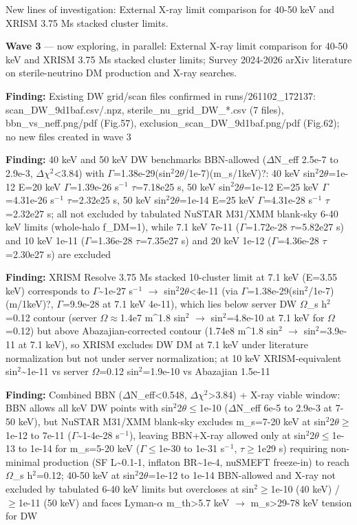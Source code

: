\documentclass[11pt,a4paper]{article}
\begin{document}
New lines of investigation: External X-ray limit comparison for 40-50 keV and XRISM 3.75 Ms stacked cluster limits.

\textbf{Wave 3} --- now exploring, in parallel: External X-ray limit comparison for 40-50 keV and XRISM 3.75 Ms stacked cluster limits; Survey 2024-2026 arXiv literature on sterile-neutrino DM production and X-ray searches.

\textbf{Finding:} Existing DW grid/scan files confirmed in runs/261102\_172137: scan\_DW\_9d1baf.csv/.npz, sterile\_nu\_grid\_DW\_*.csv (7 files), bbn\_vs\_neff.png/pdf (Fig.57), exclusion\_scan\_DW\_9d1baf.png/pdf (Fig.62); no new files created in wave 3

\textbf{Finding:} 40 keV and 50 keV DW benchmarks BBN-allowed ($\Delta$N\_eff 2.5e-7 to 2.9e-3, $\Delta$$\chi$$^2$\textless{}3.84) with $\Gamma$=1.38e-29(sin$^2$2$\theta$/1e-7)(m\_s/1keV)?: 40 keV sin$^2$2$\theta$=1e-12 E=20 keV $\Gamma$=1.39e-26 s$^-$$^1$ $\tau$=7.18e25 s, 50 keV sin$^2$2$\theta$=1e-12 E=25 keV $\Gamma$=4.31e-26 s$^-$$^1$ $\tau$=2.32e25 s, 50 keV sin$^2$2$\theta$=1e-14 E=25 keV $\Gamma$=4.31e-28 s$^-$$^1$ $\tau$=2.32e27 s; all not excluded by tabulated NuSTAR M31/XMM blank-sky 6-40 keV limits (whole-halo f\_DM=1), while 7.1 keV 7e-11 ($\Gamma$=1.72e-28 $\tau$=5.82e27 s) and 10 keV 1e-11 ($\Gamma$=1.36e-28 $\tau$=7.35e27 s) and 20 keV 1e-12 ($\Gamma$=4.36e-28 $\tau$=2.30e27 s) are excluded

\textbf{Finding:} XRISM Resolve 3.75 Ms stacked 10-cluster limit at 7.1 keV (E=3.55 keV) corresponds to $\Gamma$\textasciitilde{}1e-27 s$^-$$^1$ $\to$ sin$^2$2$\theta$\textless{}4e-11 (via $\Gamma$=1.38e-29(sin$^2$/1e-7)(m/1keV)?, $\Gamma$=9.9e-28 at 7.1 keV 4e-11), which lies below server DW $\Omega$\_s h$^2$=0.12 contour (server $\Omega$$\approx$1.4e7 m\textasciicircum{}1.8 sin$^2$ $\to$ sin$^2$=4.8e-10 at 7.1 keV for $\Omega$=0.12) but above Abazajian-corrected contour (1.74e8 m\textasciicircum{}1.8 sin$^2$ $\to$ sin$^2$=3.9e-11 at 7.1 keV), so XRISM excludes DW DM at 7.1 keV under literature normalization but not under server normalization; at 10 keV XRISM-equivalent sin$^2$\textasciitilde{}1e-11 vs server $\Omega$=0.12 sin$^2$=1.9e-10 vs Abazajian 1.5e-11

\textbf{Finding:} Combined BBN ($\Delta$N\_eff\textless{}0.548, $\Delta$$\chi$$^2$\textgreater{}3.84) + X-ray viable window: BBN allows all keV DW points with sin$^2$2$\theta$$\leq$1e-10 ($\Delta$N\_eff 6e-5 to 2.9e-3 at 7-50 keV), but NuSTAR M31/XMM blank-sky excludes m\_s=7-20 keV at sin$^2$2$\theta$$\geq$1e-12 to 7e-11 ($\Gamma$\textasciitilde{}1-4e-28 s$^-$$^1$), leaving BBN+X-ray allowed only at sin$^2$2$\theta$$\leq$1e-13 to 1e-14 for m\_s=5-20 keV ($\Gamma$$\leq$1e-30 to 1e-31 s$^-$$^1$, $\tau$$\geq$1e29 s) requiring non-minimal production (SF L\textasciitilde{}0.1-1, inflaton BR\textasciitilde{}1e-4, nuSMEFT freeze-in) to reach $\Omega$\_s h$^2$=0.12; 40-50 keV at sin$^2$2$\theta$=1e-12 to 1e-14 BBN-allowed and X-ray not excluded by tabulated 6-40 keV limits but overcloses at sin$^2$$\geq$1e-10 (40 keV) / $\geq$1e-11 (50 keV) and faces Lyman-$\alpha$ m\_th\textgreater{}5.7 keV $\to$ m\_s\textgreater{}29-78 keV tension for DW
\end{document}
